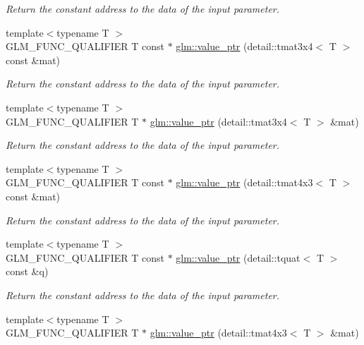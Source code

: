 \begin{DoxyCompactItemize}
\begin{DoxyCompactList}\small\item\em Return the constant address to the data of the input parameter. \end{DoxyCompactList}\item 
{\footnotesize template$<$typename T $>$ }\\G\-L\-M\-\_\-\-F\-U\-N\-C\-\_\-\-Q\-U\-A\-L\-I\-F\-I\-E\-R T const $\ast$ \hyperlink{group__gtc__type__ptr_gaa38c5a2be6c64a69e7e5d64b70137e1c}{glm\-::value\-\_\-ptr} (detail\-::tmat3x4$<$ T $>$ const \&mat)
\begin{DoxyCompactList}\small\item\em Return the constant address to the data of the input parameter. \end{DoxyCompactList}\item 
{\footnotesize template$<$typename T $>$ }\\G\-L\-M\-\_\-\-F\-U\-N\-C\-\_\-\-Q\-U\-A\-L\-I\-F\-I\-E\-R T $\ast$ \hyperlink{group__gtc__type__ptr_ga7a9cf1d2fb02f56ba01e27ad528aac7d}{glm\-::value\-\_\-ptr} (detail\-::tmat3x4$<$ T $>$ \&mat)
\begin{DoxyCompactList}\small\item\em Return the constant address to the data of the input parameter. \end{DoxyCompactList}\item 
{\footnotesize template$<$typename T $>$ }\\G\-L\-M\-\_\-\-F\-U\-N\-C\-\_\-\-Q\-U\-A\-L\-I\-F\-I\-E\-R T const $\ast$ \hyperlink{group__gtc__type__ptr_gacca7d201301551a24dbf7eef343a14c1}{glm\-::value\-\_\-ptr} (detail\-::tmat4x3$<$ T $>$ const \&mat)
\begin{DoxyCompactList}\small\item\em Return the constant address to the data of the input parameter. \end{DoxyCompactList}\item 
{\footnotesize template$<$typename T $>$ }\\G\-L\-M\-\_\-\-F\-U\-N\-C\-\_\-\-Q\-U\-A\-L\-I\-F\-I\-E\-R T const $\ast$ \hyperlink{group__gtc__type__ptr_ga348519eaf9bb56244727eabb314f6892}{glm\-::value\-\_\-ptr} (detail\-::tquat$<$ T $>$ const \&q)
\begin{DoxyCompactList}\small\item\em Return the constant address to the data of the input parameter. \end{DoxyCompactList}\item 
{\footnotesize template$<$typename T $>$ }\\G\-L\-M\-\_\-\-F\-U\-N\-C\-\_\-\-Q\-U\-A\-L\-I\-F\-I\-E\-R T $\ast$ \hyperlink{group__gtc__type__ptr_gae821d2d76715dfe8eb4a9c7eac845dc4}{glm\-::value\-\_\-ptr} (detail\-::tmat4x3$<$ T $>$ \&mat)

\end{DoxyCompactItemize}
